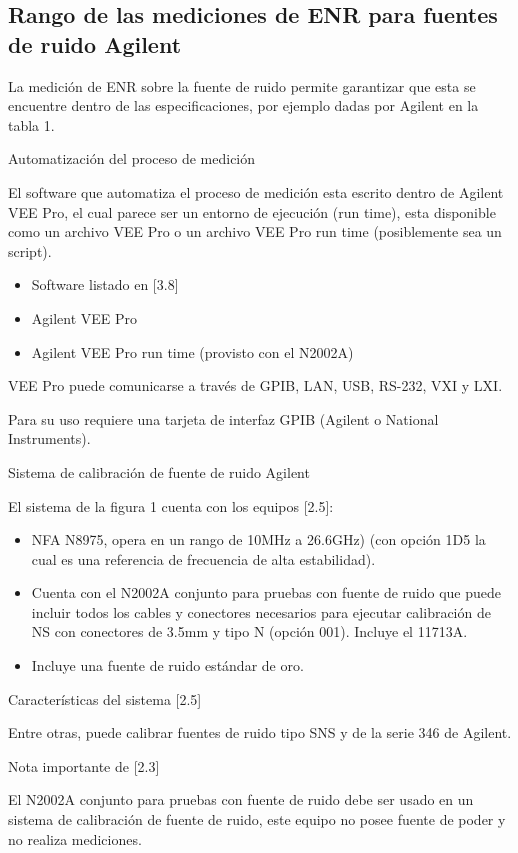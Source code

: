 \subsection{Rango de las mediciones de ENR para fuentes de ruido Agilent}
La medición de ENR sobre la fuente de ruido permite garantizar que esta se encuentre dentro de las especificaciones, por ejemplo dadas por Agilent en la tabla 1.		

Automatización del proceso de medición

El software que automatiza el proceso de medición esta escrito dentro de Agilent VEE Pro, el cual parece ser un entorno de ejecución (run time), esta disponible como un archivo VEE Pro o un archivo VEE Pro run time (posiblemente sea un script). 

\begin{itemize}
\item Software listado en [3.8]
\item Agilent VEE Pro
\item Agilent VEE Pro run time (provisto con el N2002A)
\end{itemize}
VEE Pro puede comunicarse a través de GPIB, LAN, USB, RS-232, VXI y LXI.

Para su uso requiere una tarjeta de interfaz GPIB (Agilent o National Instruments).

Sistema de calibración de fuente de ruido Agilent		

El sistema de la figura 1 cuenta con los equipos [2.5]:

\begin{itemize}
\item NFA N8975, opera en un rango de 10MHz a 26.6GHz) (con opción 1D5 la cual es una referencia de frecuencia de alta
estabilidad). 
\item Cuenta con el N2002A conjunto para pruebas con fuente de ruido que puede incluir todos los cables y conectores
necesarios para ejecutar calibración de NS con conectores de 3.5mm y tipo N (opción 001). Incluye el 11713A. 
\item Incluye una fuente de ruido estándar de oro.
\end{itemize}
Características del sistema [2.5]

Entre otras, puede calibrar fuentes de ruido tipo SNS y de la serie 346 de Agilent.

Nota importante de [2.3]

El N2002A conjunto para pruebas con fuente de ruido debe ser usado en un sistema de calibración de fuente de ruido, este
equipo no posee fuente de poder y no realiza mediciones.


